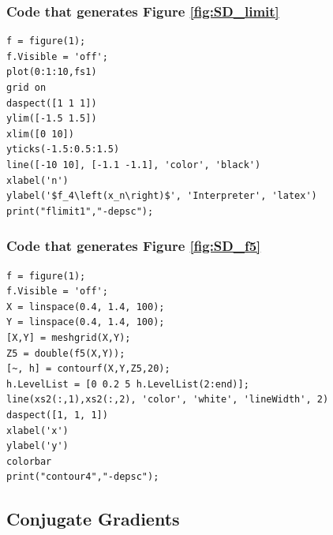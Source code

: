 \documentclass[11pt]{article} %
\let\originalleft\left
\let\originalright\right
\renewcommand{\left}{\mathopen{}\mathclose\bgroup\originalleft}
\renewcommand{\right}{\aftergroup\egroup\originalright}
\begin{document}
\subsubsection*{Code that generates Figure \ref{fig:SD_limit}}
\begin{lstlisting}
f = figure(1);
f.Visible = 'off';
plot(0:1:10,fs1)
grid on
daspect([1 1 1])
ylim([-1.5 1.5])
xlim([0 10])
yticks(-1.5:0.5:1.5)
line([-10 10], [-1.1 -1.1], 'color', 'black')
xlabel('n')
ylabel('$f_4\left(x_n\right)$', 'Interpreter', 'latex')
print("flimit1","-depsc");
\end{lstlisting}
\subsubsection*{Code that generates Figure \ref{fig:SD_f5}}
\begin{lstlisting}
f = figure(1);
f.Visible = 'off';
X = linspace(0.4, 1.4, 100);
Y = linspace(0.4, 1.4, 100);
[X,Y] = meshgrid(X,Y);
Z5 = double(f5(X,Y));
[~, h] = contourf(X,Y,Z5,20);
h.LevelList = [0 0.2 5 h.LevelList(2:end)];
line(xs2(:,1),xs2(:,2), 'color', 'white', 'lineWidth', 2)
daspect([1, 1, 1])
xlabel('x')
ylabel('y')
colorbar
print("contour4","-depsc");
\end{lstlisting}
\subsection*{Conjugate Gradients}
\end{document}
